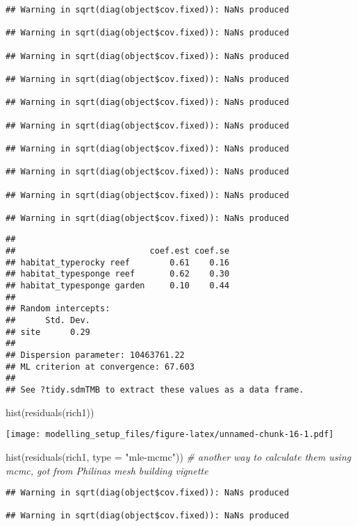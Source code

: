 \documentclass[
]{article}
\newenvironment{Shaded}{\begin{snugshade}}{\end{snugshade}}
\newcommand{\AttributeTok}[1]{\textcolor[rgb]{0.77,0.63,0.00}{#1}}
\newcommand{\CommentTok}[1]{\textcolor[rgb]{0.56,0.35,0.01}{\textit{#1}}}
\newcommand{\FunctionTok}[1]{\textcolor[rgb]{0.00,0.00,0.00}{#1}}
\newcommand{\NormalTok}[1]{#1}
\newcommand{\StringTok}[1]{\textcolor[rgb]{0.31,0.60,0.02}{#1}}
\begin{document}
\begin{verbatim}
## Warning in sqrt(diag(object$cov.fixed)): NaNs produced

## Warning in sqrt(diag(object$cov.fixed)): NaNs produced

## Warning in sqrt(diag(object$cov.fixed)): NaNs produced

## Warning in sqrt(diag(object$cov.fixed)): NaNs produced

## Warning in sqrt(diag(object$cov.fixed)): NaNs produced

## Warning in sqrt(diag(object$cov.fixed)): NaNs produced

## Warning in sqrt(diag(object$cov.fixed)): NaNs produced

## Warning in sqrt(diag(object$cov.fixed)): NaNs produced

## Warning in sqrt(diag(object$cov.fixed)): NaNs produced

## Warning in sqrt(diag(object$cov.fixed)): NaNs produced
\end{verbatim}

\begin{verbatim}
##  
##                           coef.est coef.se
## habitat_typerocky reef        0.61    0.16
## habitat_typesponge reef       0.62    0.30
## habitat_typesponge garden     0.10    0.44
## 
## Random intercepts:
##      Std. Dev.
## site      0.29
## 
## Dispersion parameter: 10463761.22
## ML criterion at convergence: 67.603
## 
## See ?tidy.sdmTMB to extract these values as a data frame.
\end{verbatim}

\begin{Shaded}
\begin{Highlighting}[]
\FunctionTok{hist}\NormalTok{(}\FunctionTok{residuals}\NormalTok{(rich1)) }
\end{Highlighting}
\end{Shaded}

\texttt{[image: modelling\_setup\_files/figure-latex/unnamed-chunk-16-1.pdf]}

\begin{Shaded}
\begin{Highlighting}[]
\FunctionTok{hist}\NormalTok{(}\FunctionTok{residuals}\NormalTok{(rich1, }\AttributeTok{type =} \StringTok{"mle{-}mcmc"}\NormalTok{)) }\CommentTok{\# another way to calculate them using mcmc, got from Philina\textquotesingle{}s mesh building vignette}
\end{Highlighting}
\end{Shaded}

\begin{verbatim}
## Warning in sqrt(diag(object$cov.fixed)): NaNs produced

## Warning in sqrt(diag(object$cov.fixed)): NaNs produced
\end{verbatim}
\end{document}
